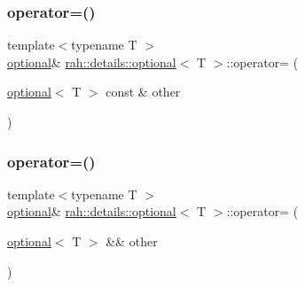 \subsubsection{\texorpdfstring{operator=()}{operator=()}\hspace{0.1cm}{\footnotesize\ttfamily [1/4]}}
{\footnotesize\ttfamily template$<$typename T $>$ \\
\mbox{\hyperlink{structrah_1_1details_1_1optional}{optional}}\& \mbox{\hyperlink{structrah_1_1details_1_1optional}{rah\+::details\+::optional}}$<$ T $>$\+::operator= (\begin{DoxyParamCaption}\item[{\mbox{\hyperlink{structrah_1_1details_1_1optional}{optional}}$<$ T $>$ const \&}]{other }\end{DoxyParamCaption})\hspace{0.3cm}{\ttfamily [inline]}}

\mbox{\label{structrah_1_1details_1_1optional_a0d5ac07cf78e2054a6484c43dbe72734}} 
\subsubsection{\texorpdfstring{operator=()}{operator=()}\hspace{0.1cm}{\footnotesize\ttfamily [2/4]}}
{\footnotesize\ttfamily template$<$typename T $>$ \\
\mbox{\hyperlink{structrah_1_1details_1_1optional}{optional}}\& \mbox{\hyperlink{structrah_1_1details_1_1optional}{rah\+::details\+::optional}}$<$ T $>$\+::operator= (\begin{DoxyParamCaption}\item[{\mbox{\hyperlink{structrah_1_1details_1_1optional}{optional}}$<$ T $>$ \&\&}]{other }\end{DoxyParamCaption})\hspace{0.3cm}{\ttfamily [inline]}}

\mbox{\label{structrah_1_1details_1_1optional_a710769ec58836829924e64354b000e6f}} 

